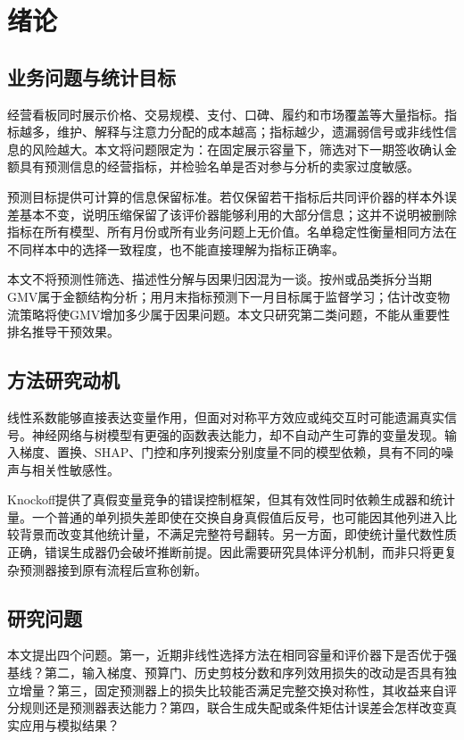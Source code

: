 \documentclass{sufethesismas}
\begin{document}
\chapter{绪论}

\section{业务问题与统计目标}

经营看板同时展示价格、交易规模、支付、口碑、履约和市场覆盖等大量指标。指标越多，维护、解释与注意力分配的成本越高；指标越少，遗漏弱信号或非线性信息的风险越大。本文将问题限定为：在固定展示容量下，筛选对下一期签收确认金额具有预测信息的经营指标，并检验名单是否对参与分析的卖家过度敏感。

预测目标提供可计算的信息保留标准。若仅保留若干指标后共同评价器的样本外误差基本不变，说明压缩保留了该评价器能够利用的大部分信息；这并不说明被删除指标在所有模型、所有月份或所有业务问题上无价值。名单稳定性衡量相同方法在不同样本中的选择一致程度，也不能直接理解为指标正确率。

本文不将预测性筛选、描述性分解与因果归因混为一谈。按州或品类拆分当期GMV属于金额结构分析；用月末指标预测下一月目标属于监督学习；估计改变物流策略将使GMV增加多少属于因果问题。本文只研究第二类问题，不能从重要性排名推导干预效果。

\section{方法研究动机}

线性系数能够直接表达变量作用，但面对对称平方效应或纯交互时可能遗漏真实信号。神经网络与树模型有更强的函数表达能力，却不自动产生可靠的变量发现。输入梯度、置换、SHAP、门控和序列搜索分别度量不同的模型依赖，具有不同的噪声与相关性敏感性。

Knockoff提供了真假变量竞争的错误控制框架，但其有效性同时依赖生成器和统计量。一个普通的单列损失差即使在交换自身真假值后反号，也可能因其他列进入比较背景而改变其他统计量，不满足完整符号翻转。另一方面，即使统计量代数性质正确，错误生成器仍会破坏推断前提。因此需要研究具体评分机制，而非只将更复杂预测器接到原有流程后宣称创新。

\section{研究问题}

本文提出四个问题。第一，近期非线性选择方法在相同容量和评价器下是否优于强基线？第二，输入梯度、预算门、历史剪枝分数和序列效用损失的改动是否具有独立增量？第三，固定预测器上的损失比较能否满足完整交换对称性，其收益来自评分规则还是预测器表达能力？第四，联合生成失配或条件矩估计误差会怎样改变真实应用与模拟结果？
\end{document}
